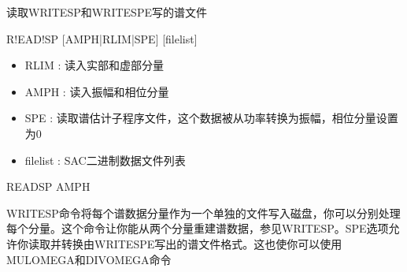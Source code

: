 \label{cmd:readsp}

读取WRITESP和WRITESPE写的谱文件

\begin{SACSTX}
R!EAD!SP [AMPH|RLIM|SPE] [filelist]
\end{SACSTX}

\begin{itemize}
\item RLIM :  读入实部和虚部分量 
\item AMPH :  读入振幅和相位分量 
\item SPE : 读取谱估计子程序文件，这个数据被从功率转换为振幅，相位分量设置为0 
\item filelist : SAC二进制数据文件列表 
\end{itemize}

\begin{SACDFT}
READSP AMPH
\end{SACDFT}

WRITESP命令将每个谱数据分量作为一个单独的文件写入磁盘，你可以分别处理每个分量。这个命令让你能从两个分量重建谱数据，参见WRITESP。SPE选项允许你读取并转换由WRITESPE写出的谱文件格式。这也使你可以使用MULOMEGA和DIVOMEGA命令

